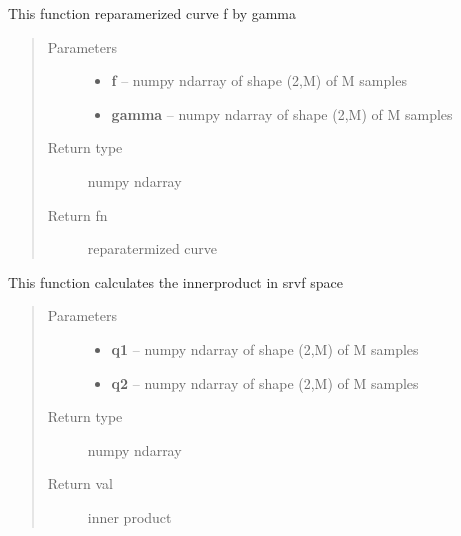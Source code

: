 \documentclass[letterpaper,10pt,english]{sphinxmanual}
\begin{document}

\begin{fulllineitems}
\label{curve_functions:curve_functions.group_action_by_gamma_coord}
This function reparamerized curve f by gamma
\begin{quote}\begin{description}
\item[{Parameters}] \leavevmode\begin{itemize}
\item {} 
\textbf{f} -- numpy ndarray of shape (2,M) of M samples

\item {} 
\textbf{gamma} -- numpy ndarray of shape (2,M) of M samples

\end{itemize}

\item[{Return type}] \leavevmode
numpy ndarray

\item[{Return fn}] \leavevmode
reparatermized curve

\end{description}\end{quote}

\end{fulllineitems}


\begin{fulllineitems}
\label{curve_functions:curve_functions.innerprod_q}
This function calculates the innerproduct in srvf space
\begin{quote}\begin{description}
\item[{Parameters}] \leavevmode\begin{itemize}
\item {} 
\textbf{q1} -- numpy ndarray of shape (2,M) of M samples

\item {} 
\textbf{q2} -- numpy ndarray of shape (2,M) of M samples

\end{itemize}

\item[{Return type}] \leavevmode
numpy ndarray

\item[{Return val}] \leavevmode
inner product

\end{description}\end{quote}

\end{fulllineitems}
\end{document}
